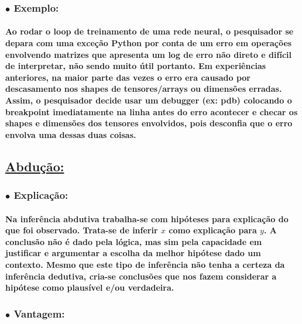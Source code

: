 \documentclass[a4paper]{article}    %
\begin{document}
\subsubsection*{\hspace{5mm}$\bullet$ Exemplo:}
\paragraph{Ao rodar o loop de treinamento de uma rede neural, o pesquisador se depara com uma exceção Python por conta de um erro em operações envolvendo matrizes que apresenta um log de erro não direto e difícil de interpretar, não sendo muito útil portanto. Em experiências anteriores, na maior parte das vezes o erro era causado por descasamento nos shapes de tensores/arrays ou dimensões erradas. Assim, o pesquisador decide usar um debugger (ex: pdb) colocando o breakpoint imediatamente na linha antes do erro acontecer e checar os shapes e dimensões dos tensores envolvidos, pois desconfia que o erro envolva uma dessas duas coisas.}

\subsection*{\underline{Abdução:}}

\subsubsection*{\hspace{5mm}$\bullet$ Explicação:}
\paragraph{Na inferência abdutiva trabalha-se com hipóteses para explicação do que foi observado. Trata-se de inferir $x$ como explicação para $y$. A conclusão não é dado pela lógica, mas sim pela capacidade em justificar e argumentar a escolha da melhor hipótese dado um contexto. Mesmo que este tipo de inferência não tenha a certeza da inferência dedutiva, cria-se conclusões que nos fazem considerar a hipótese como plausível e/ou verdadeira.}

\subsubsection*{\hspace{5mm}$\bullet$ Vantagem:}
\end{document}
